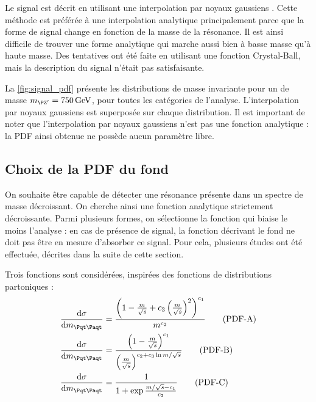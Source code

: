 Le signal est décrit en utilisant une interpolation par noyaux gaussiens \citep{Cranmer:2000du}. Cette méthode est préférée à une interpolation analytique principalement parce que la forme de signal change en fonction de la masse de la résonance. Il est ainsi difficile de trouver une forme analytique qui marche aussi bien à basse masse qu'à haute masse. Des tentatives ont été faite en utilisant une fonction Crystal-Ball, mais la description du signal n'était pas satisfaisante.

\medskip

La \cref{fig:signal_pdf} présente les distributions de masse invariante pour un \zprime de masse $\mzp = \SI{750}{\GeV}$, pour toutes les catégories de l'analyse. L'interpolation par noyaux gaussiens est superposée sur chaque distribution. Il est important de noter que l'interpolation par noyaux gaussiens n'est pas une fonction analytique : la PDF ainsi obtenue ne possède aucun paramètre libre.

\subsection{Choix de la PDF du fond}

On souhaite être capable de détecter une résonance présente dans un spectre de masse décroissant. On cherche ainsi une fonction analytique strictement décroissante. Parmi plusieurs formes, on sélectionne la fonction qui biaise le moins l'analyse : en cas de présence de signal, la fonction décrivant le fond ne doit pas être en mesure d'absorber ce signal. Pour cela, plusieurs études ont été effectuée, décrites dans la suite de cette section.

\medskip

Trois fonctions sont considérées, inspirées des fonctions de distributions partoniques :
\begin{align}
  \frac{\mathrm{d}\sigma}{\mathrm{d}\mtt} &= \frac{\left( 1 - \frac{m}{\sqrt{s}} + c_3 \left( \frac{m}{\sqrt{s}} \right)^2 \right)^{c_1}}{m^{c_2}} \tag{PDF-A} \label{pdfA} \\
  \frac{\mathrm{d}\sigma}{\mathrm{d}\mtt} &= \frac{\left( 1 - \frac{m}{\sqrt{s}} \right)^{c_1} }{ \left( \frac{m}{\sqrt{s}}  \right)^{c_2 + c_3\ln{m / \sqrt{s}}}} \tag{PDF-B} \label{pdfB} \\
  \frac{\mathrm{d}\sigma}{\mathrm{d}\mtt} &= \frac{1}{1 + \exp{\frac{m / \sqrt{s} - c_1}{c_2}}} \tag{PDF-C} \label{pdfC}
\end{align}

